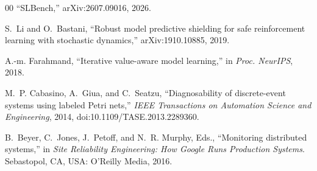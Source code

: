 \documentclass[conference]{IEEEtran}
\begin{document}
\begin{thebibliography}{00}
 ``SLBench,'' arXiv:2607.09016, 2026.

 S.~Li and O.~Bastani, ``Robust model predictive shielding for safe reinforcement learning with stochastic dynamics,'' arXiv:1910.10885, 2019.

 A.-m. Farahmand, ``Iterative value-aware model learning,'' in \emph{Proc. NeurIPS}, 2018.

 M.~P. Cabasino, A.~Giua, and C.~Seatzu, ``Diagnosability of discrete-event systems using labeled Petri nets,'' \emph{IEEE Transactions on Automation Science and Engineering}, 2014, doi:10.1109/TASE.2013.2289360.

 B.~Beyer, C.~Jones, J.~Petoff, and N.~R. Murphy, Eds., ``Monitoring distributed systems,'' in \emph{Site Reliability Engineering: How Google Runs Production Systems}. Sebastopol, CA, USA: O'Reilly Media, 2016.

\end{thebibliography}
\end{document}
